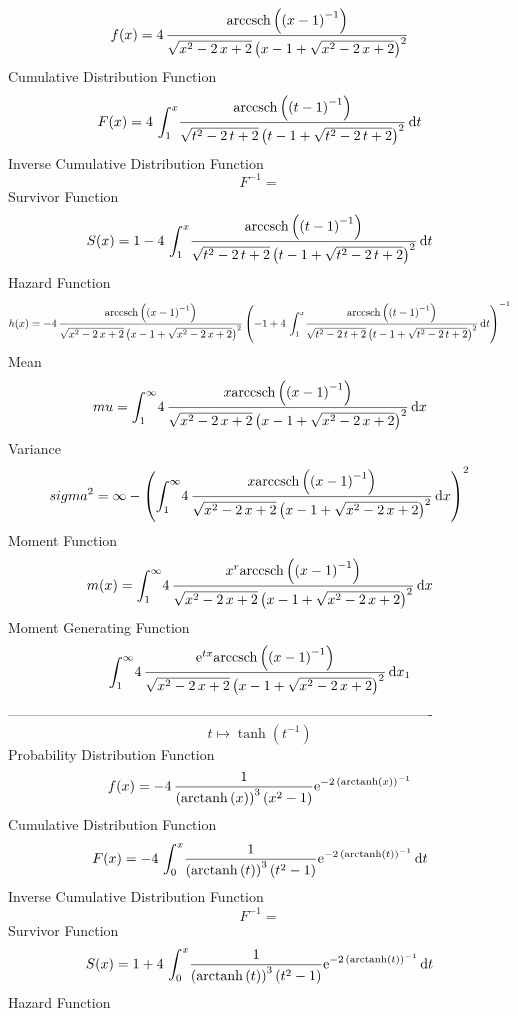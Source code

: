 \documentclass[12pt]{article}
\begin{document}
$$  f(x)=4\,{\frac {{\rm arccsch} \left( \left( x-1 \right) ^{-1}\right)}{
\sqrt {{x}^{2}-2\,x+2} \left( x-1+\sqrt {{x}^{2}-2\,x+2} \right) ^{2}}
}
$$Cumulative Distribution Function  
 $$F(x)=4\,\int_{1}^{x}\!{\frac {{\rm arccsch} \left( \left( t-1 \right) ^{-1}
\right)}{\sqrt {{t}^{2}-2\,t+2} \left( t-1+\sqrt {{t}^{2}-2\,t+2}
 \right) ^{2}}}\,{\rm d}t
$$ Inverse Cumulative Distribution Function 
  $$F^{-1} = $$Survivor Function 
 $$ S(x)=1-4\,\int_{1}^{x}\!{\frac {{\rm arccsch} \left( \left( t-1 \right) ^{-
1}\right)}{\sqrt {{t}^{2}-2\,t+2} \left( t-1+\sqrt {{t}^{2}-2\,t+2}
 \right) ^{2}}}\,{\rm d}t
$$ Hazard Function 
 $$ h(x)=-4\,{\frac {{\rm arccsch} \left( \left( x-1 \right) ^{-1}\right)}{
\sqrt {{x}^{2}-2\,x+2} \left( x-1+\sqrt {{x}^{2}-2\,x+2} \right) ^{2}}
 \left( -1+4\,\int_{1}^{x}\!{\frac {{\rm arccsch} \left( \left( t-1
 \right) ^{-1}\right)}{\sqrt {{t}^{2}-2\,t+2} \left( t-1+\sqrt {{t}^{2
}-2\,t+2} \right) ^{2}}}\,{\rm d}t \right) ^{-1}}
$$Mean 
 $$ mu=\int_{1}^{\infty }\!4\,{\frac {x{\rm arccsch} \left( \left( x-1
 \right) ^{-1}\right)}{\sqrt {{x}^{2}-2\,x+2} \left( x-1+\sqrt {{x}^{2
}-2\,x+2} \right) ^{2}}}\,{\rm d}x
$$ Variance 
 $$ sigma^2 = \infty - \left( \int_{1}^{\infty }\!4\,{\frac {x{\rm arccsch} \left(
 \left( x-1 \right) ^{-1}\right)}{\sqrt {{x}^{2}-2\,x+2} \left( x-1+
\sqrt {{x}^{2}-2\,x+2} \right) ^{2}}}\,{\rm d}x \right) ^{2}
$$Moment Function 
 $$ m(x) = \int_{1}^{\infty }\!4\,{\frac {{x}^{r}{\rm arccsch} \left( \left( x-1
 \right) ^{-1}\right)}{\sqrt {{x}^{2}-2\,x+2} \left( x-1+\sqrt {{x}^{2
}-2\,x+2} \right) ^{2}}}\,{\rm d}x
$$ Moment Generating Function 
 $$\int_{1}^{\infty }\!4\,{\frac {{{\rm e}^{tx}}{\rm arccsch} \left(
 \left( x-1 \right) ^{-1}\right)}{\sqrt {{x}^{2}-2\,x+2} \left( x-1+
\sqrt {{x}^{2}-2\,x+2} \right) ^{2}}}\,{\rm d}x_{{1}}
$$-------------------------------------------------------------------------------------------  \\$$t\mapsto \tanh \left( {t}^{-1} \right) 
$$Probability Distribution Function 
$$  f(x)=-4\,{\frac {1}{ \left( {\rm arctanh} \left(x\right) \right) ^{3}
 \left( {x}^{2}-1 \right) }{{\rm e}^{-2\, \left( {\rm arctanh} \left(x
\right) \right) ^{-1}}}}
$$Cumulative Distribution Function  
 $$F(x)=-4\,\int_{0}^{x}\!{\frac {1}{ \left( {\rm arctanh} \left(t\right)
 \right) ^{3} \left( {t}^{2}-1 \right) }{{\rm e}^{-2\, \left( 
{\rm arctanh} \left(t\right) \right) ^{-1}}}}\,{\rm d}t
$$ Inverse Cumulative Distribution Function 
  $$F^{-1} = $$Survivor Function 
 $$ S(x)=1+4\,\int_{0}^{x}\!{\frac {1}{ \left( {\rm arctanh} \left(t\right)
 \right) ^{3} \left( {t}^{2}-1 \right) }{{\rm e}^{-2\, \left( 
{\rm arctanh} \left(t\right) \right) ^{-1}}}}\,{\rm d}t
$$ Hazard Function 
\end{document}
